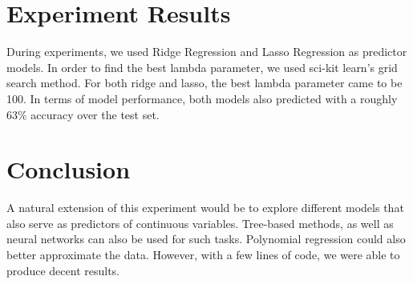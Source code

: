 \documentclass[11pt, letterpaper]{article}
\begin{document}
\section{Experiment Results}

During experiments, we used Ridge Regression and Lasso Regression as predictor models. In order to find the best lambda parameter, we used sci-kit learn's grid search method. For both ridge and lasso, the best lambda parameter came to be 100. In terms of model performance, both models also predicted with a roughly 63\% accuracy over the test set. 

\section{Conclusion}
A natural extension of this experiment would be to explore different models that also serve as predictors of continuous variables. Tree-based methods, as well as neural networks can also be used for such tasks. Polynomial regression could also better approximate the data. However, with a few lines of code, we were able to produce decent results.
\end{document}
